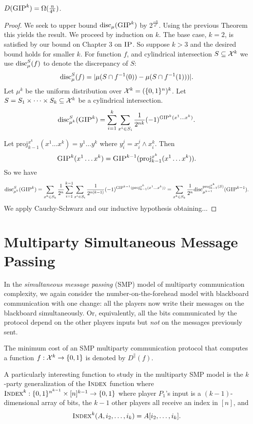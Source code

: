 \begin{theorem}
$D(\textsc{GIP}^k) = \Omega(\frac{n}{4^k})$.
\end{theorem}

\begin{proof}
We seek to upper bound $\mathrm{disc}_\mu(\textsc{GIP}^k)$ by $2^{\frac{-n}{4^k}}$. Using the previous Theorem this yields the result. We proceed by induction on $k$. The base case, $k=2$, is satisfied by our bound on Chapter $3$ on $\textsc{IP}$. So suppose $k>3$ and the  desired bound holds for smaller $k$. For function $f$, and cylindrical intersection $S\subseteq \mathcal{X}^k$ we use $\mathrm{disc}_\mu^S(f)$ to denote the discrepancy of $S$:
$$\mathrm{disc}_\mu^S(f) = |\mu(S\cap f^{-1}(0)) - \mu(S\cap f^{-1}(1)))|.$$
Let $\mu^k$ be the uniform distribution over $\mathcal{X}^k = (\{0,1\}^n)^k$. Let $S = S_1\times \dots \times S_k\subseteq \mathcal{X}^k$ be a cylindrical intersection.
$$\mathrm{disc}_{\mu^k}^S(\textsc{GIP}^k) = \sum_{i=1}^k\sum_{x^i \in S_i} \frac{1}{2^{nk}}(-1)^{\textsc{GIP}^k(x^1\dots x^k)}.$$

Let $\text{proj}_{k-1}^{x^k}(x^1\dots x^k) = y^1\dots y^k$ where $y^j_i = x^j_i \wedge x^k_i$. Then
$$\textsc{GIP}^k(x^1\dots x^k) = \textsc{GIP}^{k-1}(\text{proj}_{k-1}^{x^k}(x^1\dots x^k)).$$
So we have
$$\mathrm{disc}_{\mu^k}^S(\textsc{GIP}^k) = \sum_{x^k\in S_k}\frac{1}{2^n}\sum_{i=1}^{k-1}\sum_{x^i \in S_i}\frac{1}{2^{n(k-1)}}(-1)^{\textsc{GIP}^{k-1}(\text{proj}_{k-1}^{x^k}(x^1\dots x^k))} = \sum_{x^k \in S_k}\frac{1}{2^n}\mathrm{disc}^{\text{proj}_{k-1}^{x^k}(S)}_{\mu^{k-1}}(\textsc{GIP}^{k-1}). $$
We apply Cauchy-Schwarz and our inductive hypothesis obtaining...
\end{proof}



\newpage 
\section{Multiparty Simultaneous Message Passing}

In the \emph{simultaneous message passing} (SMP) model of multiparty communication complexity, we again consider the number-on-the-forehead model with blackboard communication with one change: all the players now write their messages on the blackboard simultaneously. Or, equivalently, all the bits communicated by the protocol depend on the other players inputs but \emph{not} on the messages previously sent.

The minimum cost of an SMP multiparty communication protocol that computes a function $f : \mathcal{X}^k \to \{0,1\}$ is denoted by $D^\parallel(f)$.

A particularly interesting function to study in the multiparty SMP model is the $k$-party generalization of the $\textsc{Index}$ function where $\textsc{Index}^k : \{0,1\}^{n^{k-1}} \times [n]^{k-1} \to \{0,1\}$ where player $P_1$'s input is a $(k-1)$-dimensional array of bits, the $k-1$ other players all receive an index in $[n]$, and
\[
\textsc{Index}^k(A,i_2,\ldots,i_k) = A[i_2,\ldots,i_k].
\]

